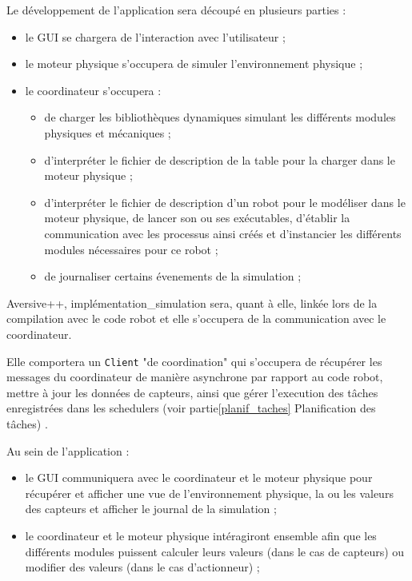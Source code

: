 \label{architecture}

Le développement de l'application sera découpé en plusieurs parties :
\begin{itemize}
    \item le GUI se chargera de l'interaction avec l'utilisateur ;
    \item le moteur physique s'occupera de simuler l'environnement physique ;
    \item le coordinateur s'occupera :
    \begin{itemize}
        \item de charger les bibliothèques dynamiques simulant les différents modules physiques et mécaniques ;
        \item d'interpréter le fichier de description de la table pour la charger dans le moteur physique ;
        \item d'interpréter le fichier de description d'un robot pour le modéliser dans le moteur physique, de lancer son ou ses exécutables, d'établir la communication avec les processus ainsi créés et d'instancier les différents modules nécessaires pour ce robot ;
        \item de journaliser certains évenements de la simulation ;
    \end{itemize}
\end{itemize}

Aversive++, implémentation\_simulation sera, quant à elle, linkée lors de la compilation avec le code robot et elle s'occupera de la communication avec le coordinateur.

Elle comportera un \texttt{Client} "de coordination" qui s'occupera de récupérer les messages du coordinateur de manière asynchrone par rapport au code robot, mettre à jour les données de capteurs, ainsi que gérer l'execution des tâches enregistrées dans les schedulers (voir partie\ref{planif_taches} Planification des tâches) .

Au sein de l'application :
\begin{itemize}
    \item le GUI communiquera avec le coordinateur et le moteur physique pour récupérer et afficher une vue de l'environnement physique, la ou les valeurs des capteurs et afficher le journal de la simulation ;
    \item le coordinateur et le moteur physique intéragiront ensemble afin que les différents modules puissent calculer leurs valeurs (dans le cas de capteurs) ou modifier des valeurs (dans le cas d'actionneur) ;
\end{itemize}

